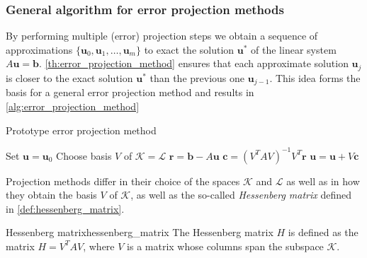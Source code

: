 \subsubsection{General algorithm for error projection methods}
By performing multiple (error) projection steps we obtain a sequence of approximations $\{\mathbf{u}_0, \mathbf{u}_1, \dots, \mathbf{u}_m\}$ to exact the solution $\mathbf{u}^*$ of the linear system $A\mathbf{u} = \mathbf{b}$. \cref{th:error_projection_method} ensures that each approximate solution $\mathbf{u}_j$ is closer to the exact solution $\mathbf{u}^*$ than the previous one $\mathbf{u}_{j-1}$. This idea forms the basis for a general error projection method and results in \cref{alg:error_projection_method}
\begin{algorithm}[H]
    \caption{Prototype error projection method \cite[Algorithm 5.1]{iter_method_saad}}
    \begin{algorithmic}
      \State Set $\mathbf{u} = \mathbf{u}_0$
      \State Choose basis $V$ of $\mathcal{K}=\mathcal{L}$
      \State $\mathbf{r} = \mathbf{b} - A \mathbf{u}$
      \State $\mathbf{c} = (V^TAV)^{-1}V^T\mathbf{r}$
      \State $\mathbf{u} = \mathbf{u} + V\mathbf{c}$
      \EndWhile
    \end{algorithmic}
    \label{alg:error_projection_method}
\end{algorithm}
Projection methods differ in their choice of the spaces $\mathcal{K}$ and $\mathcal{L}$ as well as in how they obtain the basis $V$ of $\mathcal{K}$, as well as the so-called \textit{Hessenberg matrix} defined in \cref{def:hessenberg_matrix}.
\begin{fancydef}{Hessenberg matrix}{hessenberg_matrix}
  The Hessenberg matrix $H$ is defined as the matrix $H = V^TAV$, where $V$ is a matrix whose columns span the subspace $\mathcal{K}$.
\end{fancydef}

